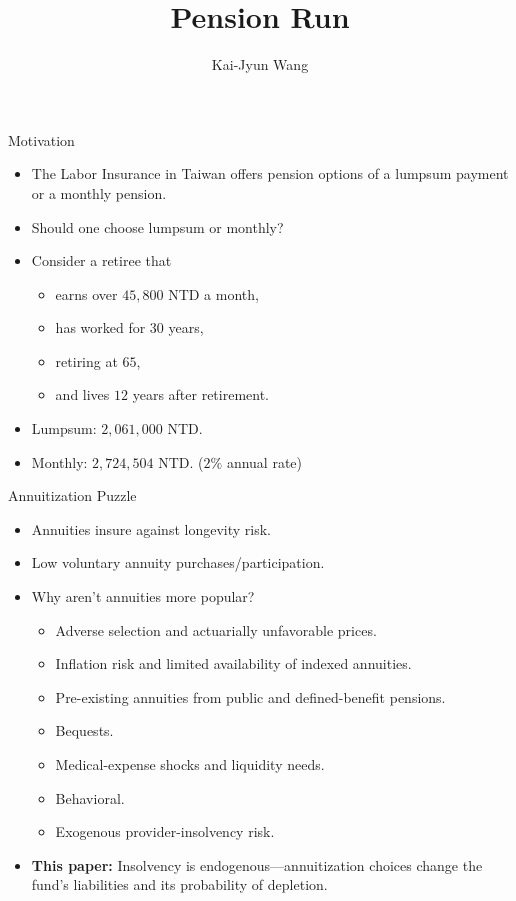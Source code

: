 \documentclass[11pt, aspectratio=169]{beamer}
\title{Pension Run}
\author{Kai-Jyun Wang}
\date{}
\begin{document}
\maketitle

\begin{frame}{Motivation}
    \begin{itemize}[<+->]
        \item The Labor Insurance in Taiwan offers pension options of a lumpsum 
        payment or a monthly pension. 
        \item Should one choose lumpsum or monthly?
        \item Consider a retiree that 
        \begin{itemize}[<+->]
            \item[-] earns over $45,800$ NTD a month, 
            \item[-] has worked for $30$ years, 
            \item[-] retiring at $65$, 
            \item[-] and lives $12$ years after retirement.   
        \end{itemize}
        \item Lumpsum: $2,061,000$ NTD. 
        \item {\color{red}Monthly: $2,724,504$ NTD}. ($2\%$ annual rate)
    \end{itemize}
\end{frame}

\begin{frame}{Annuitization Puzzle}
    \begin{itemize}[<+->]
        \item Annuities insure against longevity
        risk.
        \item Low voluntary annuity purchases/participation. 
        \item Why aren't annuities more popular?
        \begin{itemize}[<+->]
            \item[-] Adverse selection and actuarially unfavorable prices.
            \item[-] Inflation risk and limited availability of indexed annuities.
            \item[-] Pre-existing annuities from public and defined-benefit pensions.
            \item[-] Bequests. 
            \item[-] Medical-expense shocks and liquidity needs.
            \item[-] Behavioral. 
            \item[-] Exogenous provider-insolvency risk.
        \end{itemize}
        \item \textbf{This paper:} Insolvency is endogenous---annuitization choices
        change the fund's liabilities and its probability of depletion.
    \end{itemize}
\end{frame}
\end{document}
